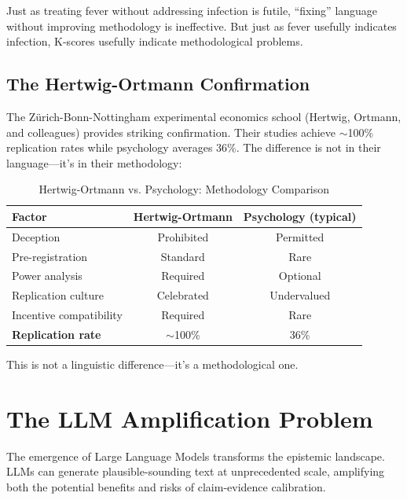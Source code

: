 \documentclass[11pt,a4paper]{article}
\begin{document}
Just as treating fever without addressing infection is futile, ``fixing'' language without improving methodology is ineffective. But just as fever usefully indicates infection, K-scores usefully indicate methodological problems.

\subsection{The Hertwig-Ortmann Confirmation}

The Zürich-Bonn-Nottingham experimental economics school (Hertwig, Ortmann, and colleagues) provides striking confirmation. Their studies achieve $\sim$100\% replication rates while psychology averages 36\%. The difference is not in their language---it's in their methodology:

\begin{table}[h]
\centering
\caption{Hertwig-Ortmann vs. Psychology: Methodology Comparison}
\label{tab:hertwig-comparison}
\begin{tabular}{p{4cm}cc}
\toprule
\textbf{Factor} & \textbf{Hertwig-Ortmann} & \textbf{Psychology (typical)} \\
\midrule
Deception & Prohibited & Permitted \\
Pre-registration & Standard & Rare \\
Power analysis & Required & Optional \\
Replication culture & Celebrated & Undervalued \\
Incentive compatibility & Required & Rare \\
\midrule
\textbf{Replication rate} & $\sim$100\% & 36\% \\
\bottomrule
\end{tabular}
\end{table}

This is not a linguistic difference---it's a methodological one.


\section{The LLM Amplification Problem}
\label{sec:llm-amplification}

The emergence of Large Language Models transforms the epistemic landscape. LLMs can generate plausible-sounding text at unprecedented scale, amplifying both the potential benefits and risks of claim-evidence calibration.
\end{document}
